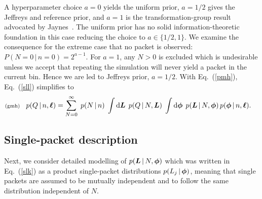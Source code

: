 \documentclass[11pt]{article}
\newcommand{\lleq}[1]{\label{#1} }
\renewcommand{\lleq}[1]{\label{#1} {\scriptstyle {\rm (#1)}} \hspace*{2ex} }
\newcommand{\cond}{\,|\,}
\newcommand{\refeq}[1]{Eq.~(\ref{#1})}
\newcommand{\rmdx}[1]{\dd{#1}} %
\begin{document}
A hyperparameter choice $a=0$ yields the uniform prior, $a=1/2$ gives
the Jeffreys and reference prior, and $a=1$ is the
transformation-group result advocated by
Jaynes~\cite[Ch. 12]{jaynes2003probability}. The uniform prior has no
solid information-theoretic foundation in this case reducing the
choice to $a \in \{1/2, 1\}$. We examine the consequence for the
extreme case that no packet is observed: $P(N=0 \cond n=0) =
2^{a-1}$. For $a=1$, any $N>0$ is excluded which is undesirable unless
we accept that repeating the simulation will never yield a packet in
the current bin. Hence we are led to Jeffreys prior, $a=1/2$.  With
\refeq{pmh}, \refeq{sll} simplifies to
\begin{align}
  \lleq{gmh}
  p(Q\cond n,\bml)
  &= \sum_{N=0}^\infty \;
    p(N\cond n)\;
    \int \rmdx{\bmL}\;
    p(Q\cond N,\bmL)\;
    \int \rmdx{\bmphi}\;
    p(\bmL\cond N,\bmphi)\,
    p(\bmphi\cond n,\bml).
\end{align}

\subsection{Single-packet description} \label{sec:single-packet}

Next, we consider detailed modelling of $p(\bmL\cond N,\bmphi)$ which
was written in Eq.~(\ref{slk}) as a product single-packet
distributions $p(L_j\cond \bmphi)$, meaning that single packets are
assumed to be mutually independent and to follow the same distribution
independent of $N$.
\end{document}

